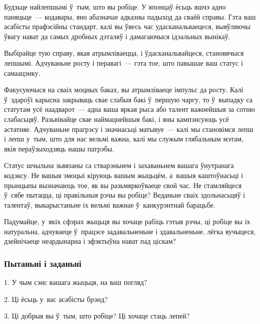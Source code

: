 Будзьце найлепшымі ў~тым, што вы робіце. У японцаў ёсьць яшчэ адно паняцьце~--- кодавары, яно абазначае адказны падыход да сваёй справы. Гэта ваш асабісты прафэсійны стандарт, калі вы ўвесь час удасканальваецеся, выяўляючы ўвагу нават да самых дробных дэталяў і дамагаючыся ідэальных вынікаў.

Выбірайце тую справу, якая атрымліваецца, і ўдасканальвайцеся, становячыся лепшымі. Адчуваньне росту і перавагі~--- гэта тое, што павышае ваш статус і самаацэнку.

Факусуючыся на сваіх моцных баках, вы атрымліваеце імпульс да росту. Калі ў~здароўі карысна закрываць свае слабыя бакі ў~першую чаргу, то ў~выпадку са статутам усё наадварот~--- адна ваша яркая рыса або талент важнейшыя за сотню слабасьцяў. Разьвівайце свае наймацнейшыя бакі, і яны кампэнсуюць усё астатняе. Адчуваньне прагрэсу і значнасьці матывуе~--- калі мы становімся лепш і лепш у~тым, што для нас вельмі важна, калі мы служым глябальным мэтам, якія пераўзыходзяць нашы патрэбы.

Статус шчыльна зьвязаны са стварэньнем і захаваньнем вашага ўнутранага кодэксу. Не вашыя эмоцыі кіруюць вашым жыцьцём, а~вашыя каштоўнасьці і прынцыпы вызначаюць тое, як вы разьмяркоўваеце свой час. Не стамляйцеся ў~сябе пытацца, ці правільныя рэчы вы робіце? Веданьне сваіх здольнасьцяў і талентаў, выкарыстаньне іх вельмі важнае ў~канкурэнтнай барацьбе.

Падумайце, у~якіх сфэрах жыцьця вы хочаце рабіць гэтыя рэчы, ці робіце вы іх натуральна, адчуваеце ў~працэсе задавальненьне і здавальненьне, лёгка вучыцеся, дзейнічаеце неардынарна і эфэктыўна нават пад ціскам?

\subsubsection{Пытаньні і заданьні}

1. У чым сэнс вашага жыцьця, на ваш погляд?

2. Ці ёсьць у~вас асабісты брэнд?

3. Ці добрыя вы ў~тым, што робіце? Ці хочаце стаць лепей?

